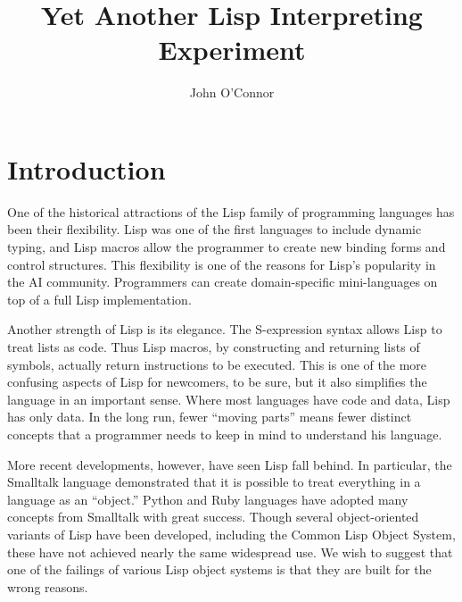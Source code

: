 \documentclass[twocolumn]{article}
\title{Yet Another Lisp Interpreting Experiment}
\author{John O'Connor}
\date{}
\begin{document}
\newcommand{\next}{\operatorname{next}}
\newcommand{\invoke}{\operatorname{invoke}}
\newcommand{\lookup}{\operatorname{lookup}}
\newcommand{\wrap}{\operatorname{wrap}}
\newcommand{\parse}{\operatorname{parse}}

\newcommand{\eval}{\texttt{eval}}
\newcommand{\call}{\texttt{call}}
\newcommand{\msg}{\texttt{msg}}

\newcommand{\lb}{\left<}
\newcommand{\rb}{\right>}

\newcommand{\ptr}{\sf \small}
\newcommand{\subptr}{\sf}

\maketitle

\section*{Introduction}
One of the historical attractions of the Lisp family of programming
languages has been their flexibility. Lisp was one of the first
languages to include dynamic typing, and Lisp macros allow the
programmer to create new binding forms and control structures. This
flexibility is one of the reasons for Lisp's popularity in the AI
community. Programmers can create domain-specific mini-languages
on top of a full Lisp implementation.

Another strength of Lisp is its elegance. The S-expression syntax
allows Lisp to treat lists as code. Thus Lisp macros, by constructing
and returning lists of symbols, actually return instructions to be
executed. This is one of the more confusing aspects of Lisp for
newcomers, to be sure, but it also simplifies the language in an
important sense. Where most languages have code and data, Lisp has
only data. In the long run, fewer ``moving parts'' means fewer
distinct concepts that a programmer needs to keep in mind to
understand his language.

More recent developments, however, have seen Lisp fall behind. In
particular, the Smalltalk language demonstrated that it is possible to
treat everything in a language as an ``object.'' Python and Ruby
languages have adopted many concepts from Smalltalk with great
success. Though several object-oriented variants of Lisp have been
developed, including the Common Lisp Object System, these have not
achieved nearly the same widespread use. We wish to suggest that one
of the failings of various Lisp object systems is that they are built
for the wrong reasons.
\end{document}
